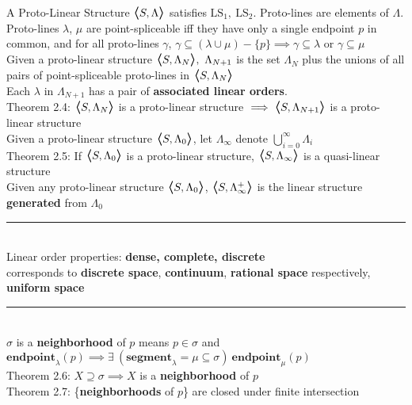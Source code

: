 \documentclass{article}
\newcommand{\hsp}[1][5]{\hspace{0.#1 cm}}
\newcommand{\hcm}[1][1]{\hspace{#1 cm}}
\newcommand{\bra}[1][1.2]{\scalebox{#1}{$\boldsymbol{\langle}$}}
\newcommand{\nl}[1][12]{\\[#1pt]}
\newcommand{\ket}[1][1.2]{\scalebox{#1}{$\boldsymbol{\rangle}$}}
\newcommand{\ch}[1]{\text{#1}}
\newcommand {\chb}[1]{\textbf{#1}}
\begin{document}
\begin{flushleft}
A Proto-Linear Structure $\bra S, \Lambda\ket$ satisfies $\ch{LS}_1,\ \ch{LS}_2$. Proto-lines are elements of $\Lambda$.\nl[10]

\hsp[2] Proto-lines $\lambda$, $\mu$ are point-spliceable iff they have only a single endpoint $p$ in common, and for all proto-lines $\gamma$, $\gamma \subseteq (\lambda \cup \mu) - \{p\} \implies \gamma \subseteq \lambda$ or $\gamma \subseteq \mu$\nl[10]

\hsp[2] Given a proto-linear structure $\bra S, \Lambda_N\ket,\ \Lambda_{N+1}$ is the set $ \Lambda_N$ plus the unions of all pairs of point-spliceable proto-lines in $\bra S, \Lambda_N\ket$\nl[10]

\hsp[2] Each $\lambda$ in $\Lambda_{N+1}$ has a pair of \chb{associated linear orders}.\nl[10]

\hcm Theorem 2.4: $\bra S, \Lambda_N\ket$ is a proto-linear structure $\implies \bra S, \Lambda_{N+1}\ket$ is a proto-linear structure\nl[10]

\hcm Given a proto-linear structure $\bra S, \Lambda_0\ket$, let $\Lambda_\infty$ denote $ \bigcup_{i=0}^\infty\Lambda_i$\nl[10]

\hcm Theorem 2.5: If $\bra S, \Lambda_0\ket$ is a proto-linear structure, $\bra S, \Lambda_\infty\ket$ is a quasi-linear structure\nl[10]

Given any proto-linear structure $\bra S, \Lambda_0\ket$, $\bra S, \Lambda_\infty^+\ket$ is the linear structure \chb{generated} from $\Lambda_0$\nl[10]

\par\noindent\rule{\textwidth}{0.4pt}\nl[5] %

Linear order properties: \chb{dense, complete, discrete}\\
corresponds to \chb{discrete space}, \chb{continuum}, \chb{rational space} respectively, \chb{uniform space}\nl[10]

\par\noindent\rule{\textwidth}{0.4pt}\nl[5] %

$\sigma$ is a \chb{neighborhood} of $p$ means $p \in \sigma$ and $\chb{endpoint}_\lambda(p) \implies \exists\  (\chb{segment}_\lambda = \mu \subseteq \sigma) \ \chb{endpoint}_\mu(p)$\nl[10]

\hcm Theorem 2.6: $X\supseteq \sigma \implies X$ is a \chb{neighborhood} of $p$\nl[5]

\hcm Theorem 2.7: \{\chb{neighborhoods} of $p$\} are closed under finite intersection\nl[10]


\end{flushleft}
\end{document}
